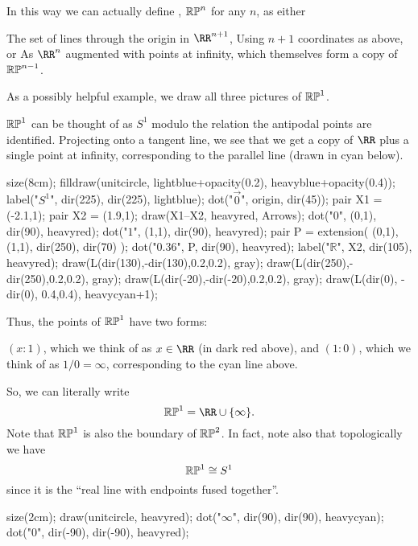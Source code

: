 \documentclass[11pt]{scrreprt}
\begin{document}
In this way we can actually define ,
$\mathbb{RP}^n$ for any $n$, as either
\begin{enumerate}[(i)]
	\ii The set of lines through the origin in $\RR^{n+1}$,
	\ii Using $n+1$ coordinates as above, or
	\ii As $\RR^n$ augmented with points at infinity,
	which themselves form a copy of $\mathbb{RP}^{n-1}$.
\end{enumerate}

As a possibly helpful example, we draw all three pictures of $\mathbb{RP}^1$.
\begin{example}
	$\mathbb{RP}^1$ can be thought of as $S^1$ modulo the relation
	the antipodal points are identified.
	Projecting onto a tangent line, we see that we get
	a copy of $\RR$ plus a single point at infinity, corresponding
	to the parallel line (drawn in cyan below).
	\begin{center}
		\begin{asy}
			size(8cm);
			filldraw(unitcircle, lightblue+opacity(0.2), heavyblue+opacity(0.4));
			label("$S^1$", dir(225), dir(225), lightblue);
			dot("$\vec 0$", origin, dir(45));
			pair X1 = (-2.1,1);
			pair X2 = (1.9,1);
			draw(X1--X2, heavyred, Arrows);
			dot("$0$", (0,1), dir(90), heavyred);
			dot("$1$", (1,1), dir(90), heavyred);
			pair P = extension( (0,1), (1,1), dir(250), dir(70) );
			dot("$0.36$", P, dir(90), heavyred);
			label("$\mathbb R$", X2, dir(105), heavyred);
			draw(L(dir(130),-dir(130),0.2,0.2), gray);
			draw(L(dir(250),-dir(250),0.2,0.2), gray);
			draw(L(dir(-20),-dir(-20),0.2,0.2), gray);
			draw(L(dir(0), -dir(0), 0.4,0.4), heavycyan+1);
		\end{asy}
	\end{center}
	Thus, the points of $\mathbb{RP}^1$ have two forms:
	\begin{itemize}
		\ii $(x:1)$, which we think of as $x \in \RR$ (in dark red above), and
		\ii $(1:0)$, which we think of as $1/0 = \infty$,
		corresponding to the cyan line above.
	\end{itemize}
	So, we can literally write
	\[ \RP^1 = \RR \cup \{\infty\}. \]
	Note that $\mathbb{RP}^1$ is also the boundary of $\mathbb{RP}^2$.
	In fact, note also that topologically we have
	\[ \mathbb{RP}^1 \cong S^1 \]
	since it is the ``real line with endpoints fused together''.
	\begin{center}
		\begin{asy}
			size(2cm);
			draw(unitcircle, heavyred);
			dot("$\infty$", dir(90), dir(90), heavycyan);
			dot("$0$", dir(-90), dir(-90), heavyred);
		\end{asy}
	\end{center}
\end{example}
\end{document}

